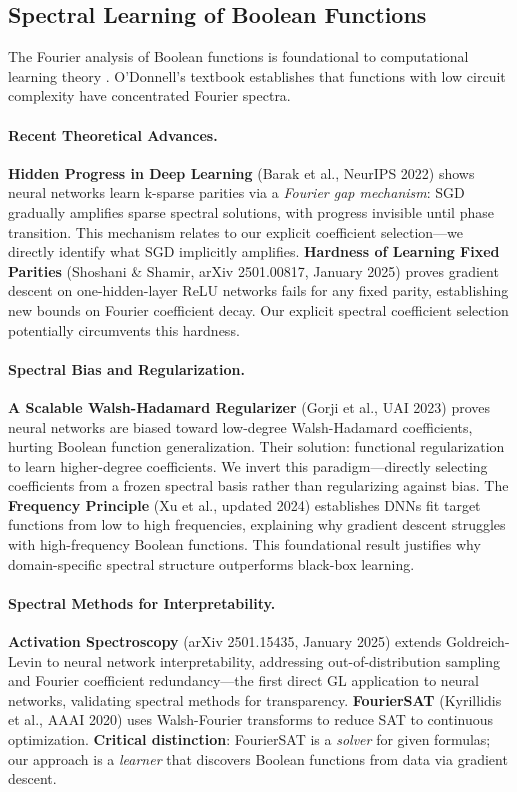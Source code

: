 \documentclass[Royal,times,sageh]{sagej}
\begin{document}
\subsection{Spectral Learning of Boolean Functions}

The Fourier analysis of Boolean functions is foundational to computational learning theory \cite{linial1993constant, kushilevitz1993learning}. O'Donnell's textbook \cite{odonnell2014analysis} establishes that functions with low circuit complexity have concentrated Fourier spectra.

\paragraph{Recent Theoretical Advances.} \textbf{Hidden Progress in Deep Learning} (Barak et al., NeurIPS 2022) shows neural networks learn k-sparse parities via a \textit{Fourier gap mechanism}: SGD gradually amplifies sparse spectral solutions, with progress invisible until phase transition. This mechanism relates to our explicit coefficient selection---we directly identify what SGD implicitly amplifies. \textbf{Hardness of Learning Fixed Parities} (Shoshani \& Shamir, arXiv 2501.00817, January 2025) proves gradient descent on one-hidden-layer ReLU networks fails for any fixed parity, establishing new bounds on Fourier coefficient decay. Our explicit spectral coefficient selection potentially circumvents this hardness.

\paragraph{Spectral Bias and Regularization.} \textbf{A Scalable Walsh-Hadamard Regularizer} (Gorji et al., UAI 2023) proves neural networks are biased toward low-degree Walsh-Hadamard coefficients, hurting Boolean function generalization. Their solution: functional regularization to learn higher-degree coefficients. We invert this paradigm---directly selecting coefficients from a frozen spectral basis rather than regularizing against bias. The \textbf{Frequency Principle} (Xu et al., updated 2024) establishes DNNs fit target functions from low to high frequencies, explaining why gradient descent struggles with high-frequency Boolean functions. This foundational result justifies why domain-specific spectral structure outperforms black-box learning.

\paragraph{Spectral Methods for Interpretability.} \textbf{Activation Spectroscopy} (arXiv 2501.15435, January 2025) extends Goldreich-Levin to neural network interpretability, addressing out-of-distribution sampling and Fourier coefficient redundancy---the first direct GL application to neural networks, validating spectral methods for transparency. \textbf{FourierSAT} (Kyrillidis et al., AAAI 2020) uses Walsh-Fourier transforms to reduce SAT to continuous optimization. \textbf{Critical distinction}: FourierSAT is a \textit{solver} for given formulas; our approach is a \textit{learner} that discovers Boolean functions from data via gradient descent.
\end{document}
